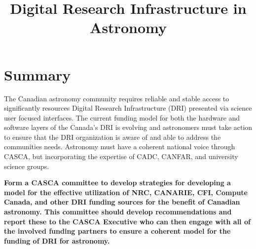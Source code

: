 \documentclass[11pt]{article}
\begin{document}

%
\setlength{\bibsep}{0.0pt}
\author{}
\title{Digital Research Infrastructure in Astronomy}
\maketitle
\section{Summary}

The Canadian astronomy community requires reliable and stable access to significantly resources Digital Research Infrastructure (DRI) presented via science user focused interfaces.  The current funding model for both the hardware and software layers of the Canada's DRI is evolving and astronomers must take action to ensure that the DRI organization is aware of and able to address the communities needs.   Astronomy must have a coherent national voice through CASCA, but incorporating the expertise of CADC, CANFAR, and university science groups.

{\bf Form a CASCA committee to develop strategies for developing a model for the effective utilization of NRC, CANARIE, CFI, Compute Canada, and other DRI funding sources for the benefit of Canadian astronomy. This committee should develop recommendations and report these to the CASCA Executive who can then engage with all of the involved funding partners to ensure a coherent model for the funding of DRI for astronomy.}
\end{document}
